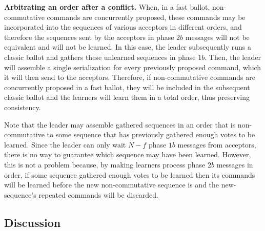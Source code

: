 \noindent \textbf{Arbitrating an order after a conflict.} When, in a fast ballot, non-commutative commands are  concurrently proposed, these commands may be incorporated into the sequences of various acceptors in different orders, and therefore the sequences sent by the acceptors in phase $2b$ messages will not be equivalent and will not be learned. In this case, the leader subsequently runs a classic ballot and gathers these unlearned sequences in phase $1b$. Then, the leader will assemble a single serialization for every previously proposed command, which it will then send to the acceptors. Therefore, if non-commutative commands are concurrently proposed in a fast ballot, they will be included in the subsequent classic ballot and the learners will learn them in a total order, thus preserving consistency. \par 
Note that the leader may assemble gathered sequences in an order that is non-commutative to some sequence that has previously gathered enough votes to be learned. Since the leader can only wait $N-f$ phase $1b$ messages from acceptors, there is no way to guarantee which sequence may have been learned. However, this is not a problem because, by making learners process phase $2b$ messages in order, if some sequence gathered enough votes to be learned then its commands will be learned before the new non-commutative sequence is and the new-sequence's repeated commands will be discarded.\par

\subsection{Discussion}

